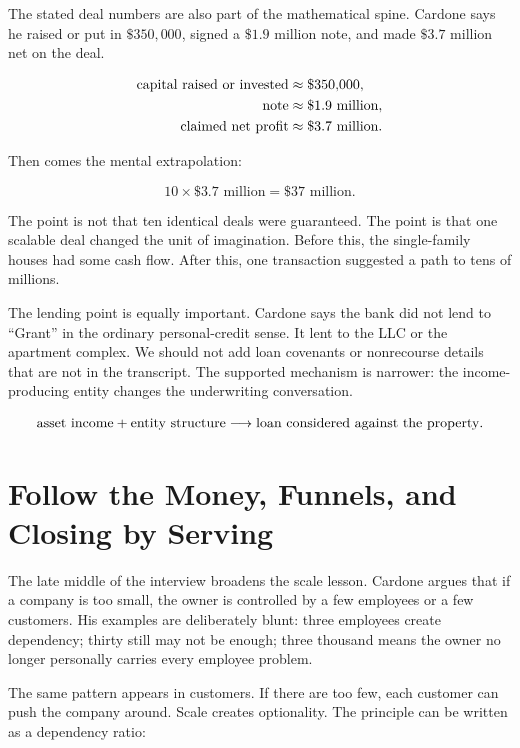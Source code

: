 The stated deal numbers are also part of the mathematical spine. Cardone says he raised or put in \(\$350{,}000\), signed a \(\$1.9\) million note, and made \(\$3.7\) million net on the deal.

\begin{align}
\hbox{capital raised or invested} &\approx \$350{,}000,\\
\hbox{note} &\approx \$1.9\text{ million},\\
\hbox{claimed net profit} &\approx \$3.7\text{ million}.
\end{align}

Then comes the mental extrapolation:

\begin{equation}
10\times \$3.7\text{ million}=\$37\text{ million}.
\end{equation}

The point is not that ten identical deals were guaranteed. The point is that one scalable deal changed the unit of imagination. Before this, the single-family houses had some cash flow. After this, one transaction suggested a path to tens of millions.

The lending point is equally important. Cardone says the bank did not lend to ``Grant'' in the ordinary personal-credit sense. It lent to the LLC or the apartment complex. We should not add loan covenants or nonrecourse details that are not in the transcript. The supported mechanism is narrower: the income-producing entity changes the underwriting conversation.

\[
\hbox{asset income}+\hbox{entity structure}
\longrightarrow
\hbox{loan considered against the property}.
\]

\section{Follow the Money, Funnels, and Closing by Serving}

The late middle of the interview broadens the scale lesson. Cardone argues that if a company is too small, the owner is controlled by a few employees or a few customers. His examples are deliberately blunt: three employees create dependency; thirty still may not be enough; three thousand means the owner no longer personally carries every employee problem.

The same pattern appears in customers. If there are too few, each customer can push the company around. Scale creates optionality. The principle can be written as a dependency ratio:

